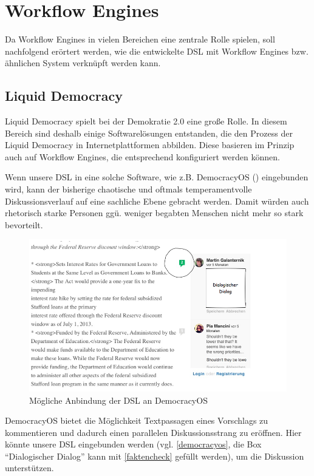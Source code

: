 \documentclass[11pt,a4paper,bibtotocnumbered]{scrreprt}
\begin{document}
\section{Workflow Engines} %

Da Workflow Engines in vielen Bereichen eine zentrale Rolle spielen, soll nachfolgend erörtert werden, wie die entwickelte DSL mit Workflow Engines bzw. ähnlichen System verknüpft werden kann.

\subsection{Liquid Democracy} %

Liquid Democracy spielt bei der Demokratie 2.0 eine große Rolle. 
In diesem Bereich sind deshalb einige Softwarelösungen entstanden, die den Prozess der Liquid Democracy in Internetplattformen abbilden.
Diese basieren im Prinzip auch auf Workflow Engines, die entsprechend konfiguriert werden können.

Wenn unsere DSL in eine solche Software, wie z.B. DemocracyOS (\cite{DemocracyOS}) eingebunden wird, kann der bisherige chaotische und oftmals temperamentvolle Diskussionsverlauf auf eine sachliche Ebene gebracht werden.
Damit würden auch rhetorisch starke Personen ggü. weniger begabten Menschen nicht mehr so stark bevorteilt.

\begin{figure}[htbp]
\centering
\includegraphics[width=1\textwidth]{img/democracyos.png}
\caption{Mögliche Anbindung der DSL an DemocracyOS}
\label{democracyos}
\end{figure}

DemocracyOS bietet die Möglichkeit Textpassagen eines Vorschlags zu kommentieren und dadurch einen parallelen Diskussionsstrang zu eröffnen. 
Hier könnte unsere DSL eingebunden werden (vgl. \autoref{democracyos}, die Box \enquote{Dialogischer Dialog} kann  mit \autoref{faktencheck} gefüllt werden), um die Diskussion unterstützen.
\end{document}
